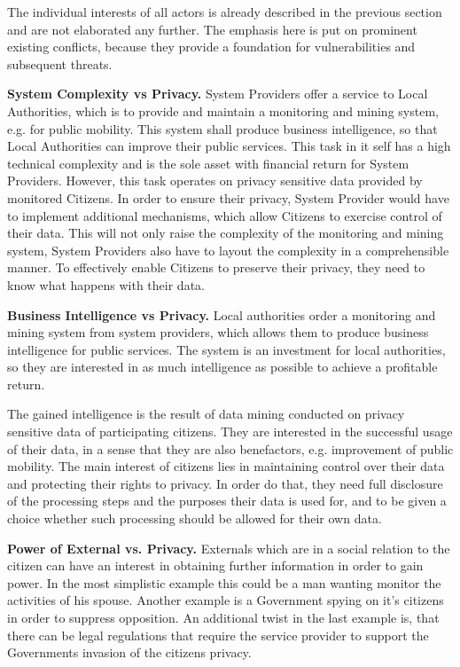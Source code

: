 The individual interests of all actors is already described in the previous section and are not elaborated any further.
The emphasis here is put on prominent existing conflicts, because they provide a foundation for vulnerabilities and subsequent threats.




\textbf{System Complexity vs Privacy.}
System Providers offer a service to Local Authorities, which is to provide and maintain a monitoring and mining system, e.g. for public mobility.
This system shall produce business intelligence, so that Local Authorities can improve their public services.
This task in it self has a high technical complexity and is the sole asset with financial return for System Providers.
However, this task operates on privacy sensitive data provided by monitored Citizens.
In order to ensure their privacy, System Provider would have to implement additional mechanisms, which allow Citizens to exercise control of their data.
This will not only raise the complexity of the monitoring and mining system, System Providers also have to layout the complexity in a comprehensible manner.
To effectively enable Citizens to preserve their privacy, they need to know what happens with their data.

\textbf{Business Intelligence vs Privacy.}
Local authorities order a monitoring and mining system from system providers, which allows them to produce business intelligence for public services.
The system is an investment for local authorities, so they are interested in as much intelligence as possible to achieve a profitable return.

The gained intelligence is the result of data mining conducted on privacy sensitive data of participating citizens.
They are interested in the successful usage of their data, in a sense that they are also benefactors, e.g. improvement of public mobility.
The main interest of citizens lies in maintaining control over their data and protecting their rights to privacy.
In order do that, they need full disclosure of the processing steps and the purposes their data is used for, and to be given a choice whether such processing should be allowed for their own data.

\textbf{Power of External vs. Privacy.}
Externals which are in a social relation to the citizen can have an interest in obtaining further information in order to gain power.
In the most simplistic example this could be a man wanting monitor the activities of his spouse.
Another example is a Government spying on it's citizens in order to suppress opposition.
An additional twist in the last example is, that there can be legal regulations that require the service provider to support the Governments invasion of the citizens privacy.

